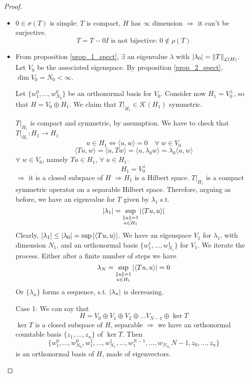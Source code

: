 \begin{proof}
    \begin{itemize}
        \item \(0 \in \sigma(T)\) is simple: \(T \) is compact, \(H\) has \(\infty\) dimension \(\Rightarrow\) it can't be surjective.
        \[
            T = T - 0 I \text{ is not bijective: } 0 \notin \rho(T)
        \]
        \item From proposition \eqref{prop_1_spect}, \(\exists \) an eigenvalue \(\lambda\) with \(\abs{\lambda_0} = \norm{T}_{\mathcal{L}(H)}\). Let \(V_0\) be the associated eigenspace. By proposition \eqref{prop_2_spect}, \(\dim V_0 = N_0 < \infty\).
        
        Let \(\{w_1^0, ..., w_{N_0}^0\}\) be an orthonormal basis for \(V_0\). Consider now \(H_1 = V_0^\perp\), so that \(H = V_0 \oplus H_1\). We claim that \(T|_{H_1} \in \mathcal{K}(H_1)\) symmetric. 

        \(T|_{H_1}\) is compact and symmetric, by assumption. We have to check that \(T|_{H_1}: H_1 \to H_1\)
        \[
            u \in H_1 \Leftrightarrow \langle u, w\rangle = 0 \quad \forall\; w \in V_0
        \]
        \[
            \langle Tu, w\rangle = \langle u, Tw\rangle = \langle u, \lambda_0 w\rangle = \lambda_0 \langle u, w\rangle
        \]
        \(\forall\; w \in V_0\), namely \(Tu \in H_1\), \(\forall\; u \in H_1\). 
        \[
            H_1 = V_0^\perp
        \]
        \(\Rightarrow\) it is a closed subspace of \(H\) \(\Rightarrow H_1\) is a Hilbert space.
        \(T|_{H_1}\) is a compact symmetric operator on a separable Hilbert space. Therefore, arguing as before, we have an eigenvalue for \(T\) given by \(\lambda_1\) s.t. 
        \[
            \abs{\lambda_1} = \sup_{
            \substack{
                \norm{u} = 1 \\
                u \in H_1}}
            \abs{\langle Tu, u\rangle}
        \]
        Clearly, \(\abs{\lambda_1} \leq \abs{\lambda_0} = \sup \abs{\langle Tu, u\rangle}\).
        We have an eigenspace \(V_1 \) for \(\lambda_1\), with dimension \(N_1\), and an orthonormal basis \(\{w_1^1, ..., w_{N_1}^1\}\) for \(V_1\). We iterate the process. 
        Either after a finite number of steps we have
        \[
            \lambda_N = \sup_{\substack{
                \norm{u} = 1 \\
                u \in H_1}} \abs{\langle Tu, u\rangle} = 0
        \]
        Or \(\{\lambda_n\}\) forms a sequence, s.t. \(\abs{\lambda_n}\) is decreasing.

        Case 1: We can say that 
        \[
            H = V_0 \oplus V_1 \oplus V_2 \oplus ... V_{N-1} \oplus \ker T
        \]
        \(\ker T\) is a closed subspace of \(H\), separable \(\Rightarrow\) we have an orthonormal countable basis \(\{z_1, ... , z_n\}\) of \(\ker T\). Then
        \[
            \{w_1^0, ..., w_{N_0}^0, w_1^1, ..., w_{N_1}^1, ..., w_1^{N-1}, ..., w_{N_{N_1}}{N-1}, z_0, ..., z_n \} 
        \]
        is an orthonormal basis of \(H\), made of eigenvectors.


\end{itemize}
\end{proof}
